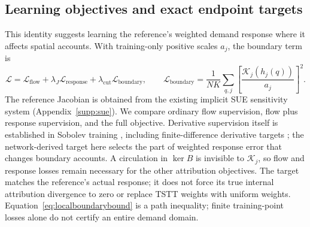 \subsection{Learning objectives and exact endpoint targets}\label{app:learning-objectives}
This identity suggests learning the reference's weighted demand response
where it affects spatial accounts. With training-only positive scales
$a_j$, the boundary term is
\begin{equation}
\mathcal L=\mathcal L_{\mathrm{flow}}+\lambda_J\mathcal L_{\mathrm{response}}
+\lambda_{\mathrm{cut}}\mathcal L_{\mathrm{boundary}},\qquad
\mathcal L_{\mathrm{boundary}}
=\frac1{NK}\sum_{q,j}\left[\frac{\mathcal K_j(h_j(q))}{a_j}\right]^2.
\label{eq:trainingobjective}
\end{equation}
The reference Jacobian is obtained from the existing implicit SUE
sensitivity system (Appendix~\ref{supp:sue}). We compare ordinary
flow supervision, flow plus response supervision, and the full objective.
Derivative supervision itself is established in Sobolev training
\citep{czarnecki2017sobolev}, including finite-difference derivative targets
\citep{yuan2022sobolev}; the network-derived target here selects the
part of weighted response error that changes boundary accounts.
A circulation in $\ker B$ is invisible to $\mathcal K_j$, so flow and
response losses remain necessary for the other attribution objectives.
The target matches the reference's actual response; it does not force
its true internal attribution divergence to zero or replace TSTT weights
with uniform weights. Equation~\eqref{eq:localboundarybound} is a path
inequality; finite training-point losses alone do not certify an entire
demand domain.


